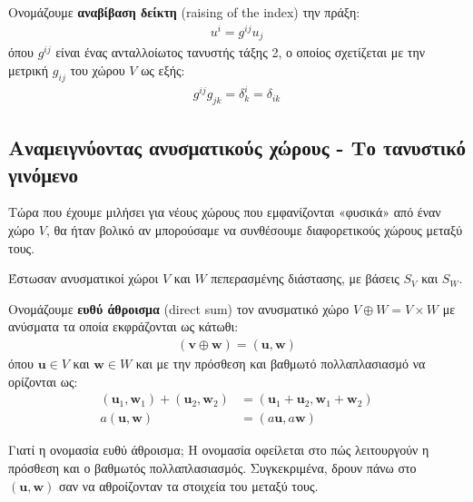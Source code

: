 \documentclass[main.tex]{subfiles}
\begin{document}
	\begin{definition}
		Ονομάζουμε \textbf{αναβίβαση δείκτη} (raising of the index) την πράξη:
		\begin{align*}
			u^i = g^{ij}u_j
		\end{align*}
		όπου $g^{ij}$ είναι ένας ανταλλοίωτος τανυστής τάξης 2, ο οποίος σχετίζεται με την μετρική $g_{ij}$ του χώρου $V$ ως εξής:
		\begin{align*}
			g^{ij}g_{jk} = \delta^i_k = \delta_{ik}
		\end{align*} 
	\end{definition} 
	
	\subsection{Αναμειγνύοντας ανυσματικούς χώρους - Το τανυστικό γινόμενο}
	Τώρα που έχουμε μιλήσει για νέους χώρους που εμφανίζονται «φυσικά» από έναν χώρο $V$, θα ήταν βολικό αν μπορούσαμε να συνθέσουμε διαφορετικούς χώρους μεταξύ τους.
	
	\begin{definition}
		Έστωσαν ανυσματικοί χώροι $V$ και $W$ πεπερασμένης διάστασης, με βάσεις $S_V$ και $S_W$.
		
		Ονομάζουμε \textbf{ευθύ άθροισμα} (direct sum) τον ανυσματικό χώρο ${V\oplus W = V\times W}$ με ανύσματα τα οποία εκφράζονται ως κάτωθι:
		\begin{align*}
			(\boldsymbol{v}\oplus\boldsymbol{w}) = (\boldsymbol{u}, \boldsymbol{w})
		\end{align*}
		όπου ${\boldsymbol{u}\in V}$ και ${\boldsymbol{w}\in W}$ και με την πρόσθεση και βαθμωτό πολλαπλασιασμό να ορίζονται ως:
		\begin{align*}
			(\boldsymbol{u}_1, \boldsymbol{w}_1) + (\boldsymbol{u}_2, \boldsymbol{w}_2) &= (\boldsymbol{u}_1 + \boldsymbol{u}_2, \boldsymbol{w}_1 + \boldsymbol{w}_2)\\
			a(\boldsymbol{u}, \boldsymbol{w}) &= (a\boldsymbol{u}, a\boldsymbol{w})
		\end{align*}
	\end{definition}

	Γιατί η ονομασία ευθύ άθροισμα; Η ονομασία οφείλεται στο πώς λειτουργούν η πρόσθεση και ο βαθμωτός πολλαπλασιασμός. Συγκεκριμένα, δρουν πάνω στο $(\boldsymbol{u},\boldsymbol{w})$ σαν να αθροίζονταν τα στοιχεία του μεταξύ τους.
	
\end{document}
